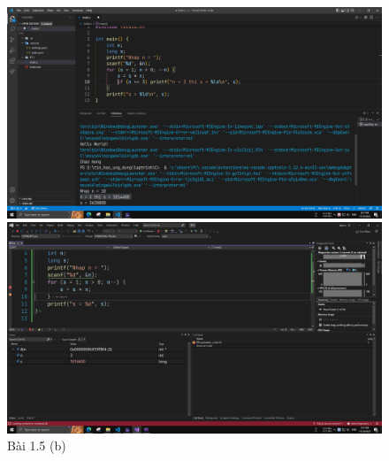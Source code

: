 \documentclass[a4paper, 12pt, notitlepage]{article}
\begin{document}
	\begin{figure}[h]
		\begin{center}
			\includegraphics[scale=0.28]{Screenshot_(1349).png}
		\end{center}
		\begin{center}
			\includegraphics[scale=0.28]{Screenshot (1363).png}
		\end{center}
		\caption{Bài 1.5 (b)}
	\end{figure}
\end{document}
